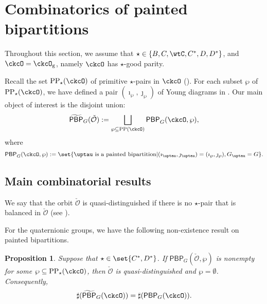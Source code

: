 \documentclass[12pt]{amsart}
\def\subset{\subseteq}
\newcommand{\CO}{{\mathcal {O}}}
\numberwithin{equation}{section}
\newtheorem{prop}[thm]{Proposition}
\theoremstyle{remark}
\def\CPP{\mathrm{PP}}
\def\CPPs{\mathrm{PP}_{\star}}
\def\tPBP{\widetilde{\mathsf{PBP}}}
\def\PBP{\mathsf{PBP}}
\def\ckcOg{\ckcO_{\mathrm g}}
\def\tPBP{\widetilde{\mathsf{PBP}}}
\def\PBPop#1#2#3#4{\PBP_{#1}^{#2}(#3,#4)}
\def\PBPGOP{\PBPop{G}{}{\ckcO}{\wp}}
\begin{document}
\section{Combinatorics of painted bipartitions}
\label{sec:com}

Throughout this section, we assume that $\star \in \{B,C,\wtC,C^{*},D,D^{*}\}$, and $\ckcO = \ckcOg$, namely $\ckcO $ has $\star$-good parity.

Recall the set  $\CPPs(\ckcO)$ of primitive $\star$-pairs in $\ckcO$ (). For each subset $\wp$ of $\CPPs(\ckcO)$, we have defined a pair   $(\imath_{\wp},\jmath_{\wp})$ of Young diagrams in . Our main object of interest is the disjoint union:
\[
  \tPBP_{G}(\check \CO):=   \bigsqcup_{\wp \subseteq \CPP(\ckcO)}\PBPGOP ,
 \]
where
\[
\PBPGOP := \set{\uptau \text{ is a painted bipartition}|  (\imath_{\uptau},\jmath_{\uptau}) = (\imath_{\wp},\jmath_{\wp}), G_{\uptau}=G}.
\]


\subsection{Main combinatorial results}
%

We say that the orbit $\check \CO$ is  quasi-distinguished
if there is no $\star$-pair that is balanced in $\check \CO$ (see ).

For the quaternionic groups, we have the following non-existence result on painted
bipartitions.

\begin{prop} \label{prop:PBP1} Suppose that $\star\in \set{C^{*}, D^{*}}$.
If $\PBP_{G}(\check \CO, \wp)$ is nonempty for some $\wp\subset \CPPs(\ckcO)$, then    $\check \CO$ is quasi-distinguished and $\wp=\emptyset$. Consequently,
     \[
     \sharp(\tPBP_{G}(\ckcO)) = \sharp(\PBP_{G}(\ckcO)).
  \]
\end{prop}
\end{document}
